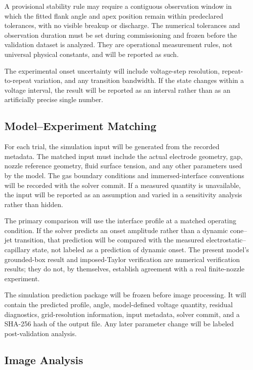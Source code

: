 A provisional stability rule may require a contiguous observation window in which the fitted flank angle and apex position remain within predeclared tolerances, with no visible breakup or discharge. The numerical tolerances and observation duration must be set during commissioning and frozen before the validation dataset is analyzed. They are operational measurement rules, not universal physical constants, and will be reported as such.

The experimental onset uncertainty will include voltage-step resolution, repeat-to-repeat variation, and any transition bandwidth. If the state changes within a voltage interval, the result will be reported as an interval rather than as an artificially precise single number.

\subsection{Model--Experiment Matching}

For each trial, the simulation input will be generated from the recorded metadata. The matched input must include the actual electrode geometry, gap, nozzle reference geometry, fluid surface tension, and any other parameters used by the model. The gas boundary conditions and immersed-interface conventions will be recorded with the solver commit. If a measured quantity is unavailable, the input will be reported as an assumption and varied in a sensitivity analysis rather than hidden.

The primary comparison will use the interface profile at a matched operating condition. If the solver predicts an onset amplitude rather than a dynamic cone--jet transition, that prediction will be compared with the measured electrostatic--capillary state, not labeled as a prediction of dynamic onset. The present model's grounded-box result and imposed-Taylor verification are numerical verification results; they do not, by themselves, establish agreement with a real finite-nozzle experiment.

The simulation prediction package will be frozen before image processing. It will contain the predicted profile, angle, model-defined voltage quantity, residual diagnostics, grid-resolution information, input metadata, solver commit, and a SHA-256 hash of the output file. Any later parameter change will be labeled post-validation analysis.

\subsection{Image Analysis}


